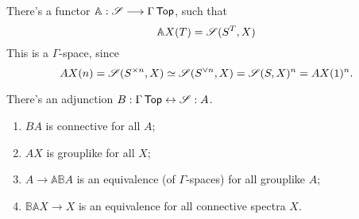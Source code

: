 \documentclass[11pt]{article}
\begin{document}
\begin{JandrGammaPractice}
There's a functor $\mathbb{A}:\mathscr{S}\longrightarrow\Gamma\operatorname{{\mathsf{Top}}}$, such that
\[\mathbb{A}X(T)=\mathscr{S}(S^T,X)\]
This is a $\Gamma$-space, since
\[AX(n)=\mathscr{S}(S^{\times n},X)\simeq \mathscr{S}(S^{\vee n},X)=\mathscr{S}(S,X)^n=AX(1)^n.\]
\begin{thm*}
There's an adjunction $B:\Gamma\operatorname{{\mathsf{Top}}}\leftrightarrow \mathscr{S}:A$.
\begin{enumerate}\squishlist
\item $BA$ is connective for all $A$;
\item $AX$ is grouplike for all $X$;
\item $A\to \mathbb{A}\mathbb{B}A$ is an equivalence (of $\Gamma$-spaces) for all grouplike $A$;
\item$\mathbb{B}\mathbb{A}X\to X$ is an equivalence for all connective spectra $X$.
\end{enumerate}
\end{thm*}


\pagebreak
\end{JandrGammaPractice}
\end{document}
